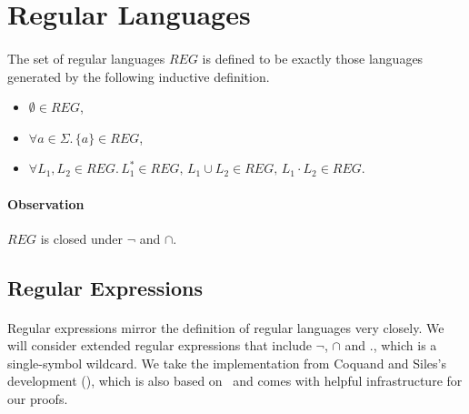 \documentclass[11pt,a4paper,oneside]{book}
\begin{document}
        \section{Regular Languages}
        
    
            \paragraph{}
            The set of regular languages $REG$ is defined to be exactly those languages generated by the following inductive definition.
            \begin{itemize}
                \item
                    $\emptyset \in REG$, 
                \item
                    $\forall a \in \Sigma. \, \{a\} \in REG$, 
                \item
                    $\forall L_1, L_2 \in REG. \, L_1^* \in REG, \, L_1 \cup L_2 \in REG, \, L_1 \cdot L_2 \in REG$.
            \end{itemize}

            \paragraph{Observation} $REG$ is closed under $\neg$ and $\cap$. 


        \subsection{Regular Expressions}

                \paragraph{} 
                Regular expressions mirror the definition of regular languages very closely. We will consider extended regular expressions that include $\neg$, $\cap$ and $.$, which is a single-symbol wildcard. 
                We take the implementation from Coquand and Siles's development (\cite{DBLP:conf/cpp/CoquandS11}), which is also based on \ssreflect\ and comes with helpful infrastructure for our proofs.
\end{document}
